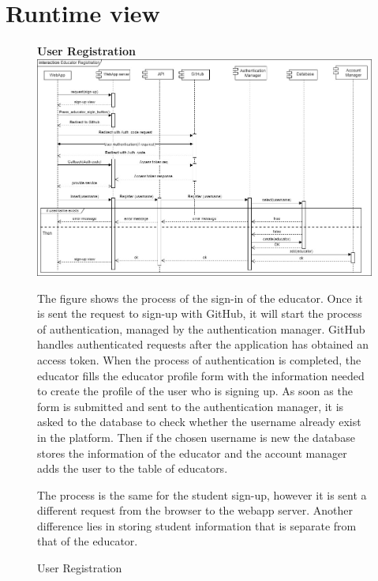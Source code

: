 \section{Runtime view}
\begin{enumerate}[label=\textbf{[UC\arabic*]}]
    \begin{figure}
    \item \textbf{User Registration}
        \centering 
        \includegraphics[width=\textwidth]{Images/User_registration.jpg}
        \caption{User Registration}
        \label{fig:enter-label}
        \raggedright The figure shows the process of the sign-in of the educator.
        Once it is sent the request to sign-up with GitHub, it will start the process of authentication, managed by the authentication manager. 
        GitHub handles authenticated requests after the application has obtained an access token.
        When the process of authentication is completed, the educator fills the educator profile form with the information needed to create the profile of the user who is signing up. 
        As soon as the form is submitted and sent to the authentication manager, it is asked to the database to check whether the username already exist in the platform. Then if the chosen username is new the database stores the information of the educator and the account manager adds the user to the table of educators.

        The process is the same for the student sign-up, however it is sent a different request from the browser to the webapp server. Another difference lies in storing student information that is separate from that of the educator. 
    \end{figure}


\end{enumerate}
